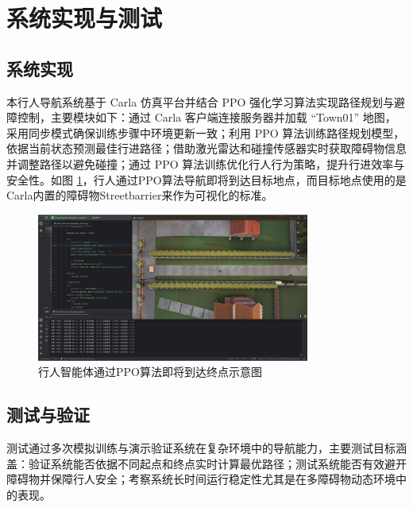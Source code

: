 	\section{系统实现与测试}
	
	\subsection{系统实现}
	
	本行人导航系统基于 Carla 仿真平台并结合 PPO 强化学习算法实现路径规划与避障控制，主要模块如下：通过 Carla 客户端连接服务器并加载 “Town01” 地图，采用同步模式确保训练步骤中环境更新一致；利用 PPO 算法训练路径规划模型，依据当前状态预测最佳行进路径；借助激光雷达和碰撞传感器实时获取障碍物信息并调整路径以避免碰撞；通过 PPO 算法训练优化行人行为策略，提升行进效率与安全性。如图 \ref{fig:ped_nav}，行人通过PPO算法导航即将到达目标地点，而目标地点使用的是Carla内置的障碍物Streetbarrier来作为可视化的标准。
	
	\begin{figure}[H]
	    \centering
	    \includegraphics[width=0.8\textwidth]{images/pedestrain_navgation.pdf}
	    \caption{行人智能体通过PPO算法即将到达终点示意图}
	    \label{fig:ped_nav}
	\end{figure}
	
	\subsection{测试与验证}
	
	测试通过多次模拟训练与演示验证系统在复杂环境中的导航能力，主要测试目标涵盖：验证系统能否依据不同起点和终点实时计算最优路径；测试系统能否有效避开障碍物并保障行人安全；考察系统长时间运行稳定性尤其是在多障碍物动态环境中的表现。
